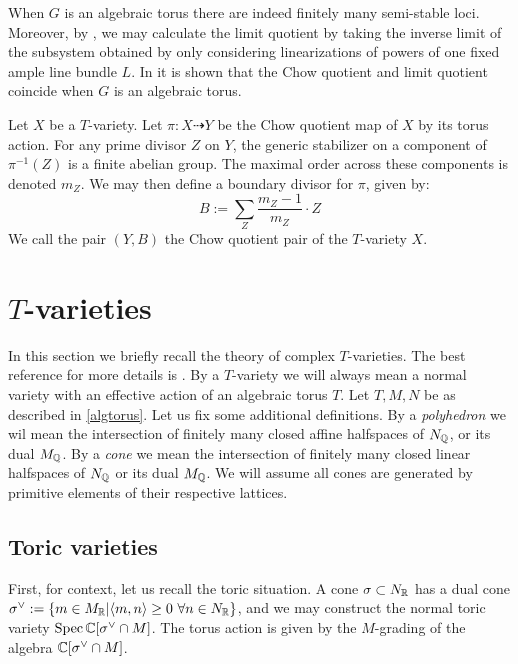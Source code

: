 When \(G\) is an algebraic torus there are indeed finitely many semi-stable loci. Moreover, by \cite[Corollary 2.7]{baker2012}, we may calculate the limit quotient by taking the inverse limit of the subsystem obtained by only considering linearizations of powers of one fixed ample line bundle \(L\).
%
%
%
In \cite[Proposition 2.5]{baker2012} it is shown that the Chow quotient and limit quotient coincide when \(G\) is an algebraic torus.
\begin{definition} \label{def:chowpair}
Let \(X\) be a \(T\)-variety. Let \(\pi:X \dashrightarrow Y\) be the Chow quotient map of \(X\) by its torus action. For any prime divisor \(Z\) on \(Y\), the generic stabilizer on a component of \(\pi^{-1}(Z)\) is a finite abelian group. The maximal order across these components is denoted \(m_Z\). We may then define a boundary divisor for \(\pi\), given by:
\begin{equation} \label{boundary}
B := \sum_Z \frac{m_Z-1}{m_Z} \cdot Z
\end{equation}
We call the pair \((Y,B)\) the Chow quotient pair of the \(T\)-variety \(X\).
\end{definition}
\section{$T$-varieties} \label{prelim:Tvar}
In this section we briefly recall the theory of complex \(T\)-varieties. The best reference for more details is \cite{altmann2006polyhedral}. By a \(T\)-variety we will always mean a normal variety with an effective action of an algebraic torus \(T\). Let \(T,M,N\) be as described in \ref{algtorus}. Let us fix some additional definitions. By a \textit{polyhedron} we wil mean the intersection of finitely many closed affine halfspaces of \(N_{\mathbb{Q}}\), or its dual \(M_{\mathbb{Q}}\). By a \textit{cone} we mean the intersection of finitely many closed linear halfspaces of \(N_{\mathbb{Q}}\) or its dual \(M_{\mathbb{Q}}\). We will assume all cones are generated by primitive elements of their respective lattices.
\subsection{Toric varieties}
First, for context, let us recall the toric situation. A cone \(\sigma \subset N_{\mathbb{R}}\) has a dual cone \(\sigma^\vee := \{m \in M_{\mathbb{R}} | \langle m, n \rangle \ge 0 \ \forall n \in N_{\mathbb{R}}\}\), and we may construct the normal toric variety \(\operatorname{Spec} \mathbb{C}[\sigma^\vee \cap M]\). The torus action is given by the \(M\)-grading of the algebra \(\mathbb{C}[\sigma^\vee \cap M]\). 

